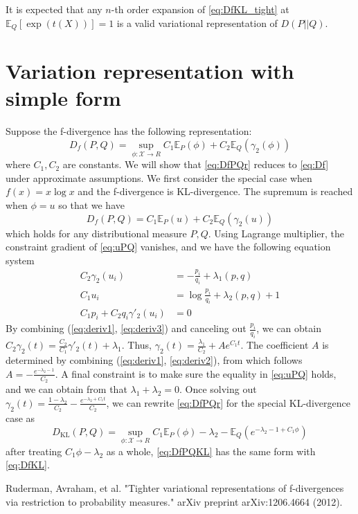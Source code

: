 \documentclass{article}
\theoremstyle{definition}
\begin{document}
It is expected that any $n$-th order expansion of \eqref{eq:DfKL_tight} at $\mathbb{E}_Q[\exp(t(X))]=1$ is a valid variational representation of $D(P||Q)$.

\section{Variation representation with simple form}
Suppose the f-divergence has the following representation:
\begin{equation}\label{eq:DfPQr}
D_f(P,Q) = \sup_{\phi: \mathcal{X} \to R} C_1 \mathbb{E}_P(\phi) + C_2 \mathbb{E}_Q(\gamma_2(\phi))
\end{equation}
where $C_1, C_2$ are constants.
We will show that \eqref{eq:DfPQr} reduces to \eqref{eq:Df} under approximate assumptions.
We first consider the special case when $f(x)=x\log x$ and the f-divergence is KL-divergence.
The supremum is reached when $\phi = u$ so that we have
\begin{equation}\label{eq:uPQ}
D_f(P, Q) = C_1 \mathbb{E}_P(u) + C_2 \mathbb{E}_Q(\gamma_2(u))
\end{equation}
which holds for any distributional measure $P, Q$.
Using Lagrange multiplier, the constraint gradient of \eqref{eq:uPQ} vanishes,
and we have the following equation system
\begin{align}
C_2 \gamma_2(u_i) & = -\frac{p_i}{q_i} + \lambda_1(p, q) \label{eq:deriv1}\\
C_1 u_i & = \log \frac{p_i}{q_i} + \lambda_2(p, q) +1 \label{eq:deriv2}\\
C_1 p_i + C_2 q_i \gamma'_2(u_i) &= 0 \label{eq:deriv3}
\end{align}
By combining (\ref{eq:deriv1}, \ref{eq:deriv3}) and canceling out $\frac{p_i}{q_i}$,
we can obtain $C_2 \gamma_2(t) = \frac{C_2}{C_1} \gamma'_2(t) + \lambda_1$.
Thus, $\gamma_2(t)= \frac{\lambda_1}{C_2} + A e^{C_1 t}$.
The coefficient $A$ is determined by combining (\ref{eq:deriv1}, \ref{eq:deriv2}), from which
follows $A=-\frac{e^{-\lambda_2 - 1}}{C_2}$. A final constraint is to make sure the equality
in \eqref{eq:uPQ} holds, and we can obtain from that $\lambda_1 + \lambda_2 = 0$. 
Once solving out $\gamma_2(t) = \frac{1-\lambda_2}{C_2} - \frac{e^{-\lambda_2 + C_1t}}{C_2}$,
we can rewrite \eqref{eq:DfPQr} for the special KL-divergence case as
\begin{equation}\label{eq:DfPQKL}
D_{\textrm{KL}}(P, Q) = \sup_{\phi: \mathcal{X} \to R} C_1 \mathbb{E}_P(\phi) -\lambda_2  - \mathbb{E}_Q(e^{-\lambda_2 -1 + C_1 \phi})
\end{equation}
after treating $C_1 \phi - \lambda_2 $ as a whole, \eqref{eq:DfPQKL} has the same form with
\eqref{eq:DfKL}.
\begin{thebibliography}{9}
	 Ruderman, Avraham, et al. "Tighter variational representations of f-divergences via restriction to probability measures." arXiv preprint arXiv:1206.4664 (2012).
\end{thebibliography}
\end{document}
